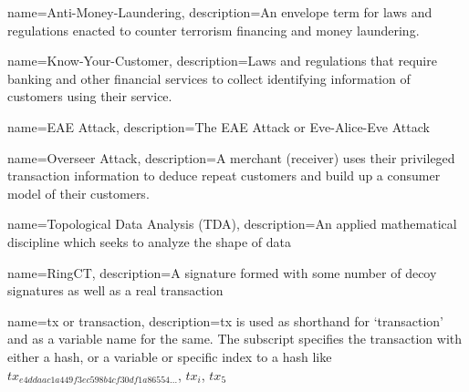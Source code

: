 {
 name=Anti-Money-Laundering,
 description=An envelope term for laws and regulations enacted to counter terrorism financing and money laundering.  
}

{
 name=Know-Your-Customer,
 description=Laws and regulations that require banking and other financial services to collect identifying information of customers using their service.  
}

{
    name=EAE Attack,
    description={The EAE Attack or Eve-Alice-Eve Attack}
}

{
    name=Overseer Attack,
    description={A merchant (receiver) uses their privileged transaction information to deduce repeat customers and build up a consumer model of their customers.}
}

{
    name=Topological Data Analysis (TDA),
    description={An applied mathematical discipline which seeks to analyze the shape of data}
}

{
  name=RingCT,
  description={A signature formed with some number of decoy signatures as well as a real transaction}
}

{
  name=tx or transaction,
  description={tx is used as shorthand for `transaction'  and as a variable name for the same.  The subscript specifies the transaction with either a hash, or a variable or specific index to a hash like $tx_{e4ddaac1a449f3ec598b4cf30df1a86554...}$, $tx_i$, $tx_5$}
}

